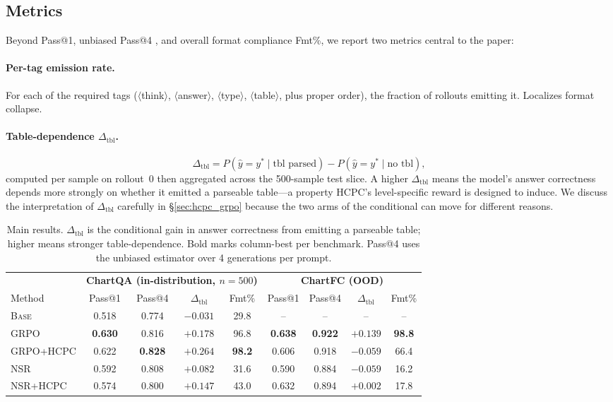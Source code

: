 \documentclass[11pt]{article}
\begin{document}
\subsection{Metrics}
\label{sec:metrics}

Beyond Pass@1, unbiased Pass@4 \citep{passatk}, and overall format
compliance Fmt\%, we report two metrics central to the paper:

\paragraph{Per-tag emission rate.} For each of the required tags
($\langle$think$\rangle$, $\langle$answer$\rangle$,
$\langle$type$\rangle$, $\langle$table$\rangle$, plus proper order),
the fraction of rollouts emitting it. Localizes format collapse.

\paragraph{Table-dependence $\Delta_{\text{tbl}}$.}
\[
\Delta_{\text{tbl}} = P(\hat y=y^*\mid\text{tbl parsed})
                    - P(\hat y=y^*\mid\text{no tbl}),
\]
computed per sample on rollout~0 then aggregated across the
500-sample test slice. A higher $\Delta_{\text{tbl}}$ means the
model's answer correctness depends more strongly on whether it emitted
a parseable table---a property HCPC's level-specific reward is
designed to induce. We discuss the interpretation of
$\Delta_{\text{tbl}}$ carefully in \S\ref{sec:hcpc_grpo} because the
two arms of the conditional can move for different reasons.

\begin{table}[t]
\centering
\small
\setlength{\tabcolsep}{5pt}
\begin{tabular}{lcccc|cccc}
\toprule
& \multicolumn{4}{c}{\textbf{ChartQA (in-distribution, $n{=}500$)}}
& \multicolumn{4}{c}{\textbf{ChartFC (OOD)}}\\
\cmidrule(lr){2-5}\cmidrule(lr){6-9}
Method & Pass@1 & Pass@4 & $\Delta_{\text{tbl}}$ & Fmt\% &
Pass@1 & Pass@4 & $\Delta_{\text{tbl}}$ & Fmt\%\\
\midrule
\textsc{Base}      & 0.518 & 0.774 & $-0.031$ & 29.8 & --    & --    & --       & --\\
\textsc{GRPO}      & \textbf{0.630} & 0.816 & $+0.178$ & 96.8 & \textbf{0.638} & \textbf{0.922} & $+0.139$ & \textbf{98.8}\\
\textsc{GRPO+HCPC} & 0.622 & \textbf{0.828} & $\mathbf{+0.264}$ & \textbf{98.2} & 0.606 & 0.918 & $-0.059$ & 66.4\\
\textsc{NSR}       & 0.592 & 0.808 & $+0.082$ & 31.6 & 0.590 & 0.884 & $-0.059$ & 16.2\\
\textsc{NSR+HCPC}  & 0.574 & 0.800 & $+0.147$ & 43.0 & 0.632 & 0.894 & $+0.002$ & 17.8\\
\bottomrule
\end{tabular}
\caption{Main results. $\Delta_{\text{tbl}}$ is the conditional gain
in answer correctness from emitting a parseable table; higher means
stronger table-dependence. Bold marks column-best per benchmark.
Pass@4 uses the unbiased estimator over 4 generations per prompt.}
\label{tab:main}
\end{table}
\end{document}
